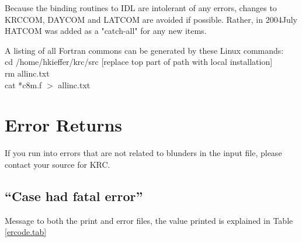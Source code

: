 \documentclass{article}
\begin{document}
Because the binding routines to IDL are intolerant of any errors, changes to
KRCCOM, DAYCOM and LATCOM are avoided if possible. Rather, in 2004July HATCOM
was added as a "catch-all" for any new items.

A listing of all Fortran commons can be generated by these Linux commands: \\ 
cd /home/hkieffer/krc/src [replace top part of path with local installation] \\ 
rm allinc.txt \\ 
cat  *c8m.f $>$ allinc.txt 
\pagebreak
              
\section{Error Returns} %

If you run into errors that are not related to blunders in the input file,
please contact your source for KRC.

\subsection{``Case had fatal error''} %
Message to both the print and error files, the value printed is explained in Table \ref{ercode.tab} 
\end{document}
